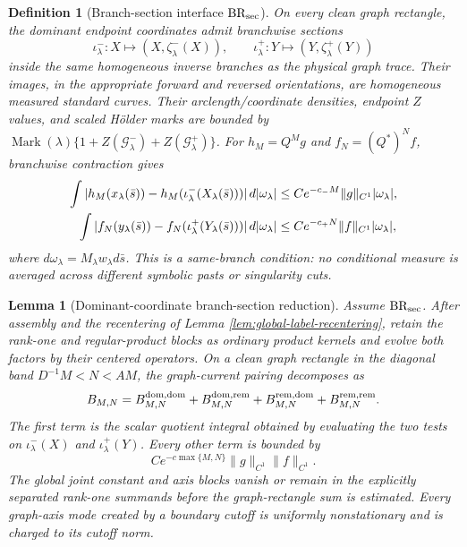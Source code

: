 \documentclass[11pt]{article}
\newtheorem{lemma}[theorem]{Lemma}
\newtheorem{definition}[theorem]{Definition}
\begin{document}
\begin{definition}[Branch-section interface $\mathrm{BR}_{\rm sec}$]
\label{def:branch-section-interface}
On every clean graph rectangle, the dominant endpoint coordinates admit
branchwise sections
\[
 \iota^-_\lambda:X\mapsto(X,\zeta^-_\lambda(X)),\qquad
 \iota^+_\lambda:Y\mapsto(Y,\zeta^+_\lambda(Y))
\]
inside the same homogeneous inverse branches as the physical graph trace.
Their images, in the appropriate forward and reversed orientations, are
homogeneous measured standard curves.  Their arclength/coordinate densities,
endpoint $Z$ values, and scaled H\"older marks are bounded by
$\operatorname{Mark}(\lambda)\{1+Z(\mathcal G^-_\lambda)+
Z(\mathcal G^+_\lambda)\}$.  For $h_M=Q^Mg$ and
$f_N=(Q^*)^Nf$, branchwise contraction gives
\begin{align}
 \int|h_M(x_\lambda(\bar s))-
 h_M(\iota^-_\lambda(X_\lambda(\bar s)))|\,d|\omega_\lambda|
 &\le Ce^{-c_-M}\|g\|_{C^1}|\omega_\lambda|,\notag\\
 \int|f_N(y_\lambda(\bar s))-
 f_N(\iota^+_\lambda(Y_\lambda(\bar s)))|\,d|\omega_\lambda|
 &\le Ce^{-c_+N}\|f\|_{C^1}|\omega_\lambda|,
 \label{eq:branch-section-contraction}
\end{align}
where $d\omega_\lambda=M_\lambda w_\lambda d\bar s$.
This is a same-branch condition: no conditional measure is averaged across
different symbolic pasts or singularity cuts.
\end{definition}

\begin{lemma}[Dominant-coordinate branch-section reduction]
\label{lem:dominant-coordinate-reduction}
Assume $\mathrm{BR}_{\rm sec}$.  After assembly and the recentering of Lemma
\ref{lem:global-label-recentering}, retain the rank-one and regular-product
blocks as ordinary product kernels and evolve both factors by their centered
operators.
On a clean graph rectangle in the diagonal band
$D^{-1}M<N<AM$, the graph-current pairing decomposes as
\begin{equation}
\label{eq:dominant-coordinate-decomposition}
 B_{M,N}=B^{\rm dom,dom}_{M,N}
 +B^{\rm dom,rem}_{M,N}+B^{\rm rem,dom}_{M,N}
 +B^{\rm rem,rem}_{M,N}.
\end{equation}
The first term is the scalar quotient integral obtained by evaluating the two
tests on $\iota^-_\lambda(X)$ and $\iota^+_\lambda(Y)$.
Every other term is bounded by
\begin{equation}
\label{eq:contracted-coordinate-error}
 Ce^{-c\max\{M,N\}}\|g\|_{C^1}\|f\|_{C^1}.
\end{equation}
The global joint constant and axis blocks vanish or remain in the explicitly
separated rank-one summands before the graph-rectangle sum is estimated.
Every graph-axis mode created by a boundary cutoff is uniformly
nonstationary and is charged to its cutoff norm.
\end{lemma}
\end{document}
